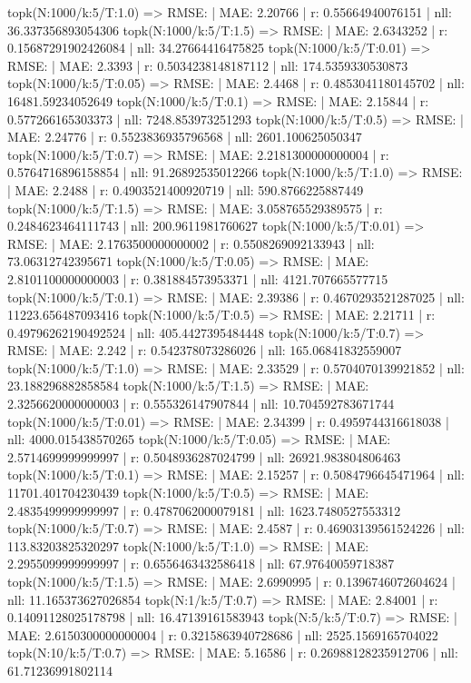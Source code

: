 topk(N:1000/k:5/T:1.0) => RMSE: | MAE: 2.20766 | r: 0.55664940076151 | nll: 36.337356893054306
topk(N:1000/k:5/T:1.5) => RMSE: | MAE: 2.6343252 | r: 0.15687291902426084 | nll: 34.27664416475825
topk(N:1000/k:5/T:0.01) => RMSE: | MAE: 2.3393 | r: 0.5034238148187112 | nll: 174.5359330530873
topk(N:1000/k:5/T:0.05) => RMSE: | MAE: 2.4468 | r: 0.4853041180145702 | nll: 16481.59234052649
topk(N:1000/k:5/T:0.1) => RMSE: | MAE: 2.15844 | r: 0.577266165303373 | nll: 7248.853973251293
topk(N:1000/k:5/T:0.5) => RMSE: | MAE: 2.24776 | r: 0.5523836935796568 | nll: 2601.100625050347
topk(N:1000/k:5/T:0.7) => RMSE: | MAE: 2.2181300000000004 | r: 0.5764716896158854 | nll: 91.26892535012266
topk(N:1000/k:5/T:1.0) => RMSE: | MAE: 2.2488 | r: 0.4903521400920719 | nll: 590.8766225887449
topk(N:1000/k:5/T:1.5) => RMSE: | MAE: 3.058765529389575 | r: 0.2484623464111743 | nll: 200.9611981760627
topk(N:1000/k:5/T:0.01) => RMSE: | MAE: 2.1763500000000002 | r: 0.5508269092133943 | nll: 73.06312742395671
topk(N:1000/k:5/T:0.05) => RMSE: | MAE: 2.8101100000000003 | r: 0.381884573953371 | nll: 4121.707665577715
topk(N:1000/k:5/T:0.1) => RMSE: | MAE: 2.39386 | r: 0.4670293521287025 | nll: 11223.656487093416
topk(N:1000/k:5/T:0.5) => RMSE: | MAE: 2.21711 | r: 0.49796262190492524 | nll: 405.4427395484448
topk(N:1000/k:5/T:0.7) => RMSE: | MAE: 2.242 | r: 0.542378073286026 | nll: 165.06841832559007
topk(N:1000/k:5/T:1.0) => RMSE: | MAE: 2.33529 | r: 0.5704070139921852 | nll: 23.188296882858584
topk(N:1000/k:5/T:1.5) => RMSE: | MAE: 2.3256620000000003 | r: 0.555326147907844 | nll: 10.704592783671744
topk(N:1000/k:5/T:0.01) => RMSE: | MAE: 2.34399 | r: 0.4959744316618038 | nll: 4000.015438570265
topk(N:1000/k:5/T:0.05) => RMSE: | MAE: 2.5714699999999997 | r: 0.5048936287024799 | nll: 26921.983804806463
topk(N:1000/k:5/T:0.1) => RMSE: | MAE: 2.15257 | r: 0.5084796645471964 | nll: 11701.401704230439
topk(N:1000/k:5/T:0.5) => RMSE: | MAE: 2.4835499999999997 | r: 0.4787062000079181 | nll: 1623.7480527553312
topk(N:1000/k:5/T:0.7) => RMSE: | MAE: 2.4587 | r: 0.46903139561524226 | nll: 113.83203825320297
topk(N:1000/k:5/T:1.0) => RMSE: | MAE: 2.2955099999999997 | r: 0.6556463432586418 | nll: 67.97640059718387
topk(N:1000/k:5/T:1.5) => RMSE: | MAE: 2.6990995 | r: 0.1396746072604624 | nll: 11.165373627026854
topk(N:1/k:5/T:0.7) => RMSE: | MAE: 2.84001 | r: 0.14091128025178798 | nll: 16.47139161583943
topk(N:5/k:5/T:0.7) => RMSE: | MAE: 2.6150300000000004 | r: 0.3215863940728686 | nll: 2525.1569165704022
topk(N:10/k:5/T:0.7) => RMSE: | MAE: 5.16586 | r: 0.26988128235912706 | nll: 61.71236991802114
